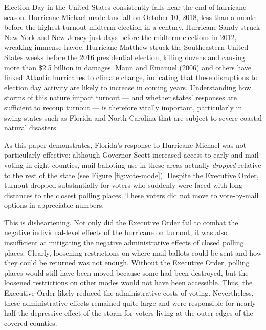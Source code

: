 \documentclass[
  12pt,
]{article}
\begin{document}
Election Day in the United States consistently falls near the end of hurricane season. Hurricane Michael made landfall on October 10, 2018, less than a month before the highest-turnout midterm election in a century. Hurricane Sandy struck New York and New Jersey just days before the midterm elections in 2012, wreaking immense havoc. Hurricane Matthew struck the Southeastern United States weeks before the 2016 presidential election, killing dozens and causing more than \$2.5 billion in damages. \protect\hyperlink{ref-Mann2006}{Mann and Emanuel} (\protect\hyperlink{ref-Mann2006}{2006}) and others have linked Atlantic hurricanes to climate change, indicating that these disruptions to election day activity are likely to increase in coming years. Understanding how storms of this nature impact turnout --- and whether states' responses are sufficient to recoup turnout --- is therefore vitally important, particularly in swing states such as Florida and North Carolina that are subject to severe coastal natural disasters.

As this paper demonstrates, Florida's response to Hurricane Michael was not particularly effective: although Governor Scott increased access to early and mail voting in eight counties, mail balloting use in these areas actually \emph{dropped} relative to the rest of the state (see Figure \ref{fig:vote-mode}). Despite the Executive Order, turnout dropped substantially for voters who suddenly were faced with long distances to the closest polling places. These voters did not move to vote-by-mail options in appreciable numbers.

This is disheartening. Not only did the Executive Order fail to combat the negative individual-level effects of the hurricane on turnout, it was also insufficient at mitigating the negative administrative effects of closed polling places. Clearly, loosening restrictions on where mail ballots could be sent and how they could be returned was not enough. Without the Executive Order, polling places would still have been moved because some had been destroyed, but the loosened restrictions on other modes would not have been accessible. Thus, the Executive Order likely reduced the administrative costs of voting. Nevertheless, these administrative effects remained quite large and were responsible for nearly half the depressive effect of the storm for voters living at the outer edges of the covered counties.
\end{document}

